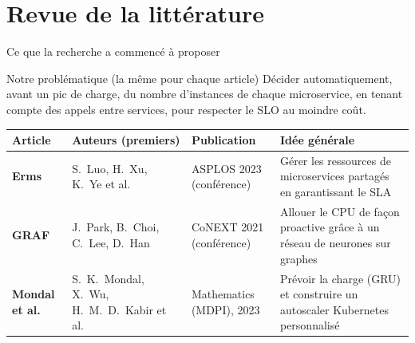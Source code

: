 \documentclass[aspectratio=169,10pt]{beamer}
\begin{document}
\section{Revue de la littérature}

\begin{frame}{Ce que la recherche a commencé à proposer}
  \begin{alertblock}{Notre problématique (la même pour chaque article)}
    \small Décider automatiquement, avant un pic de charge, du nombre d'instances de chaque microservice, en tenant compte des appels entre services, pour respecter le SLO au moindre coût.
  \end{alertblock}

  \vspace{0.2cm}
  \footnotesize
  \begin{tabular}{@{}>{\raggedright\arraybackslash}p{1.9cm}>{\raggedright\arraybackslash}p{4.4cm}>{\raggedright\arraybackslash}p{3.2cm}>{\raggedright\arraybackslash}p{4.2cm}@{}}
    \toprule
    \textbf{Article} & \textbf{Auteurs (premiers)} & \textbf{Publication} & \textbf{Idée générale} \\
    \midrule
    \textbf{Erms} & S.~Luo, H.~Xu, K.~Ye et al. & ASPLOS 2023 (conférence) & Gérer les ressources de microservices partagés en garantissant le SLA \\[6pt]
    \textbf{GRAF} & J.~Park, B.~Choi, C.~Lee, D.~Han & CoNEXT 2021 (conférence) & Allouer le CPU de façon proactive grâce à un réseau de neurones sur graphes \\[6pt]
    \textbf{Mondal et al.} & S.~K.~Mondal, X.~Wu, H.~M.~D.~Kabir et al. & Mathematics (MDPI), 2023 & Prévoir la charge (GRU) et construire un autoscaler Kubernetes personnalisé \\
    \bottomrule
  \end{tabular}
\end{frame}
\end{document}
